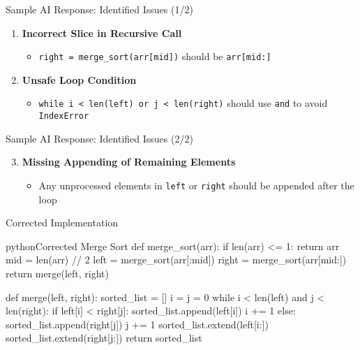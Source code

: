 \documentclass[xcolor={dvipsnames}, aspectratio=169]{beamer}
\begin{document}
\begin{frame}{Sample AI Response: Identified Issues (1/2)}
  \begin{enumerate}
    \item \textbf{Incorrect Slice in Recursive Call}
      \begin{itemize}
        \item \texttt{right = merge\_sort(arr[mid])} should be \texttt{arr[mid:]}
      \end{itemize}
    
    \item \textbf{Unsafe Loop Condition}
      \begin{itemize}
        \item \texttt{while i < len(left) or j < len(right)} should use \texttt{and} to avoid \texttt{IndexError}
      \end{itemize}
  \end{enumerate}
\end{frame}

\begin{frame}{Sample AI Response: Identified Issues (2/2)}
  \begin{enumerate}\setcounter{enumi}{2}
    \item \textbf{Missing Appending of Remaining Elements}
      \begin{itemize}
        \item Any unprocessed elements in \texttt{left} or \texttt{right} should be appended after the loop
      \end{itemize}
  \end{enumerate}
\end{frame}

\begin{frame}[fragile]{Corrected Implementation}
  \begin{codeboxtc}{python}{Corrected Merge Sort}{}{}
def merge_sort(arr):
    if len(arr) <= 1:
        return arr
    mid = len(arr) // 2
    left = merge_sort(arr[:mid])
    right = merge_sort(arr[mid:])
    return merge(left, right)

def merge(left, right):
    sorted_list = []
    i = j = 0
    while i < len(left) and j < len(right):
        if left[i] < right[j]:
            sorted_list.append(left[i])
            i += 1
        else:
            sorted_list.append(right[j])
            j += 1
    sorted_list.extend(left[i:])
    sorted_list.extend(right[j:])
    return sorted_list
  \end{codeboxtc}
\end{frame}
\end{document}
